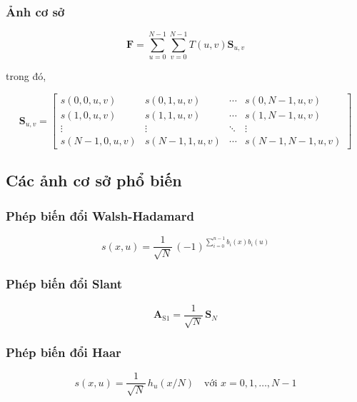 \documentclass[12pt, a4paper]{report}
\begin{document}
\subsubsection*{Ảnh cơ sở}

\begin{equation}
    \mathbf{F} = \sum _{u=0}^{N-1} \sum _{v=0}^{N-1} T(u,v) \mathbf{S} _{u,v}
\end{equation}

trong đó,

\begin{equation}
\mathbf{S}_{u,v} =
\begin{bmatrix}
s(0,0,u,v)   & s(0,1,u,v)   & \cdots & s(0,N-1,u,v) \\
s(1,0,u,v)   & s(1,1,u,v)   & \cdots & s(1,N-1,u,v) \\
\vdots       & \vdots       & \ddots & \vdots       \\
s(N-1,0,u,v) & s(N-1,1,u,v) & \cdots & s(N-1,N-1,u,v)
\end{bmatrix}
\end{equation}


\subsection{Các ảnh cơ sở phổ biến}
\subsubsection*{Phép biến đổi Walsh-Hadamard}

\begin{equation}
    s(x,u) = \frac{1}{\sqrt{N}}\,(-1)^{\sum_{i=0}^{n-1} b_i(x)b_i(u)}
\end{equation}

\subsubsection*{Phép biến đổi Slant}

\begin{equation}
    \mathbf{A}_{\mathrm{S1}} = \frac{1}{\sqrt{N}}\, \mathbf{S}_N
\end{equation}

\subsubsection*{Phép biến đổi Haar}

\begin{equation}
    s(x,u) = \frac{1}{\sqrt{N}}\, h_u(x/N) \quad \text{với } x = 0,1,\ldots,N-1
\end{equation}
\end{document}
